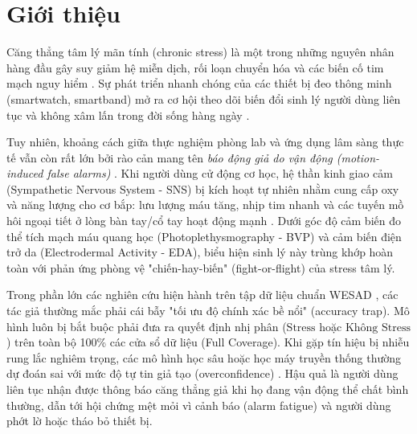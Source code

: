 \documentclass[conference]{IEEEtran}
\begin{document}
\section{Giới thiệu}
Căng thẳng tâm lý mãn tính (chronic stress) là một trong những nguyên nhân hàng đầu gây suy giảm hệ miễn dịch, rối loạn chuyển hóa và các biến cố tim mạch nguy hiểm \cite{cohen2007psychological, schneiderman2005stress, can2019stress}. Sự phát triển nhanh chóng của các thiết bị đeo thông minh (smartwatch, smartband) mở ra cơ hội theo dõi biến đổi sinh lý người dùng liên tục và không xâm lấn trong đời sống hàng ngày \cite{schmidt2018wesad, gjoreski2016continuous, sano2018multimodal}.

Tuy nhiên, khoảng cách giữa thực nghiệm phòng lab và ứng dụng lâm sàng thực tế vẫn còn rất lớn bởi rào cản mang tên \textit{báo động giả do vận động (motion-induced false alarms)} \cite{schumm2010effect, zhang2014troika, tamura2014wearable}. Khi người dùng cử động cơ học, hệ thần kinh giao cảm (Sympathetic Nervous System - SNS) bị kích hoạt tự nhiên nhằm cung cấp oxy và năng lượng cho cơ bắp: lưu lượng máu tăng, nhịp tim nhanh và các tuyến mồ hôi ngoại tiết ở lòng bàn tay/cổ tay hoạt động mạnh \cite{boucsein2012electrodermal}. Dưới góc độ cảm biến đo thể tích mạch máu quang học (Photoplethysmography - BVP) và cảm biến điện trở da (Electrodermal Activity - EDA), biểu hiện sinh lý này trùng khớp hoàn toàn với phản ứng phòng vệ "chiến-hay-biến" (fight-or-flight) của stress tâm lý. 

Trong phần lớn các nghiên cứu hiện hành trên tập dữ liệu chuẩn WESAD \cite{schmidt2018wesad, bobade2020stress, siirtola2019continuous, dalmeida2021computer, behinaein2022transformer, bottcher2023detection}, các tác giả thường mắc phải cái bẫy "tối ưu độ chính xác bề nổi" (accuracy trap). Mô hình luôn bị bắt buộc phải đưa ra quyết định nhị phân ($\text{Stress}$ hoặc $\text{Không Stress}$) trên toàn bộ 100\% các cửa sổ dữ liệu (Full Coverage). Khi gặp tín hiệu bị nhiễu rung lắc nghiêm trọng, các mô hình học sâu hoặc học máy truyền thống thường dự đoán sai với mức độ tự tin giả tạo (overconfidence) \cite{guo2017calibration}. Hậu quả là người dùng liên tục nhận được thông báo căng thẳng giả khi họ đang vận động thể chất bình thường, dẫn tới hội chứng mệt mỏi vì cảnh báo (alarm fatigue) và người dùng phớt lờ hoặc tháo bỏ thiết bị.
\end{document}
